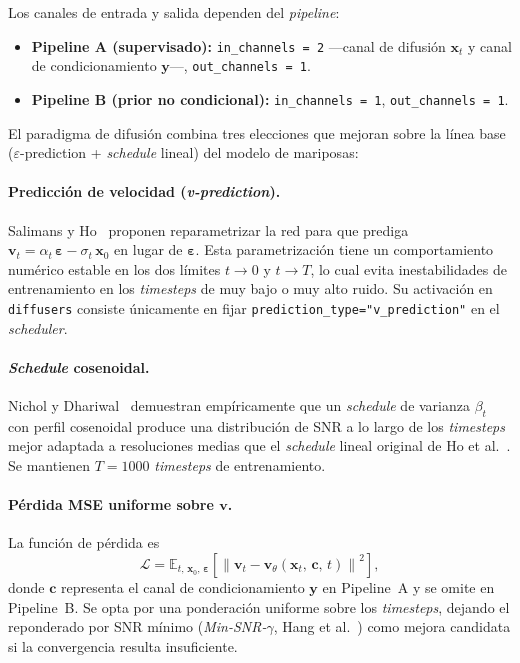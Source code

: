 Los canales de entrada y salida dependen del \textit{pipeline}:

\begin{itemize}[leftmargin=*]
    \item \textbf{Pipeline A (supervisado):} \texttt{in\_channels = 2}
    —canal de difusión $\mathbf{x}_t$ y canal de condicionamiento
    $\mathbf{y}$—, \texttt{out\_channels = 1}.
    \item \textbf{Pipeline B (prior no condicional):}
    \texttt{in\_channels = 1}, \texttt{out\_channels = 1}.
\end{itemize}

El paradigma de difusión combina tres elecciones que mejoran
sobre la línea base ($\varepsilon$-prediction + \textit{schedule}
lineal) del modelo de mariposas:

\paragraph{Predicción de velocidad (\textit{v-prediction}).}
Salimans y Ho~\cite{salimans2022vprediction} proponen
reparametrizar la red para que prediga
$\mathbf{v}_t = \alpha_t\,\boldsymbol{\varepsilon} -
\sigma_t\,\mathbf{x}_0$ en lugar de $\boldsymbol{\varepsilon}$.
Esta parametrización tiene un comportamiento numérico estable
en los dos límites $t \to 0$ y $t \to T$, lo cual evita
inestabilidades de entrenamiento en los \textit{timesteps} de
muy bajo o muy alto ruido. Su activación en \texttt{diffusers}
consiste únicamente en fijar
\texttt{prediction\_type="v\_prediction"} en el \textit{scheduler}.

\paragraph{\textit{Schedule} cosenoidal.}
Nichol y Dhariwal~\cite{nichol2021cosine} demuestran
empíricamente que un \textit{schedule} de varianza $\beta_t$ con
perfil cosenoidal produce una distribución de SNR a lo largo de
los \textit{timesteps} mejor adaptada a resoluciones medias que
el \textit{schedule} lineal original de Ho et al.~\cite{ho2020ddpm}.
Se mantienen $T = 1000$ \textit{timesteps} de entrenamiento.

\paragraph{Pérdida MSE uniforme sobre $\mathbf{v}$.}
La función de pérdida es
\begin{equation}
    \mathcal{L}
    = \mathbb{E}_{t,\, \mathbf{x}_0,\, \boldsymbol{\varepsilon}}
      \!\left[\left\|\mathbf{v}_t
        - \mathbf{v}_\theta(\mathbf{x}_t,\, \mathbf{c},\, t)
      \right\|^2\right],
\end{equation}
donde $\mathbf{c}$ representa el canal de condicionamiento
$\mathbf{y}$ en Pipeline~A y se omite en Pipeline~B. Se opta por
una ponderación uniforme sobre los \textit{timesteps}, dejando
el reponderado por SNR mínimo (\textit{Min-SNR-$\gamma$}, Hang et
al.~\cite{hang2023minsnr}) como mejora candidata si la
convergencia resulta insuficiente.

